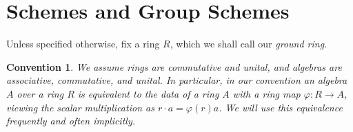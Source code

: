 \documentclass[10pt]{book}
\theoremstyle{bookplain}
\theoremstyle{bookdefinition}
\theoremstyle{bookremark}
\newtheorem{convention}[theorem]{Convention}
\begin{document}
\section{Schemes and Group Schemes}

Unless specified otherwise, fix a ring $R$, which we shall call our \textit{ground ring}. 
\begin{convention}
    We assume rings are commutative and unital, and algebras are associative, commutative, and unital. 
    In particular, in our convention an algebra $A$ over a ring $R$ is equivalent to the data of a ring $A$ with a ring map $\varphi:R\rightarrow A$, viewing the scalar multiplication as $r\cdot a=\varphi(r)a$. 
    We will use this equivalence frequently and often implicitly. 
\end{convention}
\end{document}
